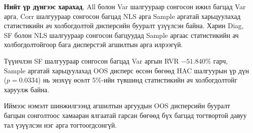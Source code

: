 \par\medskip
\noindent
\textbf{Нийт үр дүнгээс харахад},
All болон Var шалгуураар сонгосон ижил багцад
Var арга, Corr шалгуураар сонгосон багцад NLS арга
Sample аргатай харьцуулахад статистикийн
ач холбогдолтой дисперсийн бууралт үзүүлсэн байна.
Харин Diag, SF болон NLS шалгуураар сонгосон
багцуудад Sample аргаас статистикийн ач
холбогдолтойгоор бага дисперстэй агшилтын
арга илрээгүй.

Түүнчлэн SF шалгуураар сонгосон багцад Var аргын
RVR $-51.840\%$ гарч, Sample аргатай харьцуулахад
OOS дисперс өссөн бөгөөд HAC шалгуурын үр дүн
(\(p=0.0334\)) нь энэхүү өсөлт 5\%-ийн түвшинд
статистикийн ач холбогдолтойг харуулж байна.

Иймээс нэмэлт шинжилгээнд агшилтын аргуудын
OOS дисперсийн бууралт багцын сонголтоос
хамааран ялгаатай гарсан бөгөөд бүх багцад
тогтвортой давуу тал үзүүлсэн нэг арга
тогтоогдсонгүй.


